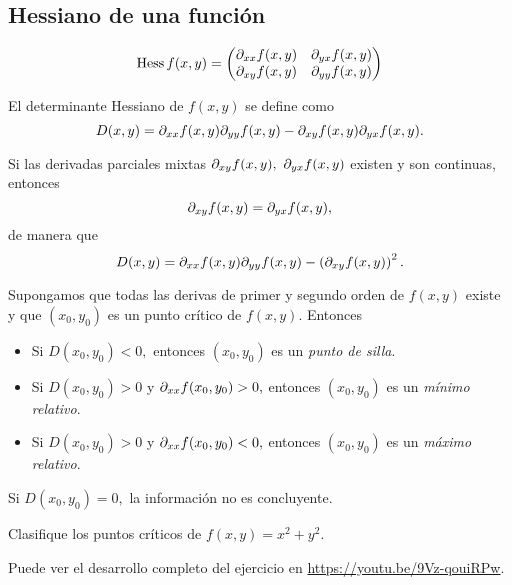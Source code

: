 \subsection{Hessiano de una funci\'on}
\[
	\label{hess}  
	\operatorname{Hess}f(x,y)=
	\begin{pmatrix}\partial_{xx}f(x,y) &\partial_{yx}f(x,y) \cr \partial_{xy}f(x,y) & \partial_{yy}f(x,y) \end{pmatrix}
\]





El determinante Hessiano de $f(x,y)$ se define como
$$
D(x,y)=\partial_{xx}f(x,y)\partial_{yy}f(x,y)-\partial_{xy}f(x,y)\partial_{yx}f(x,y).
$$



\begin{observacion}
	Si las derivadas parciales mixtas $\partial_{xy}f(x,y), \ \partial_{yx}f(x,y)$ existen y son continuas, entonces
	$$
	\partial_{xy}f(x,y)=\partial_{yx}f(x,y),
	$$
	de manera que 
	$$
	D(x,y)=\partial_{xx}f(x,y)\partial_{yy}f(x,y)-\left( \partial_{xy}f(x,y) \right)^{2}.
	$$
\end{observacion}




\begin{teorema}
	Supongamos que todas las derivas de primer y segundo orden de $f(x,y)$ existe y que $(x_{0},y_{0})$ es un punto cr\'itico de $f(x,y).$ Entonces
	\begin{itemize}
		\item Si $D(x_{0},y_{0}) < 0,$ entonces $(x_{0},y_{0})$ es un \emph{punto de silla}.
		\item Si $D(x_{0},y_{0}) > 0$ y $\partial_{xx}f(x_{0},y_{0})>0,$ entonces $(x_{0},y_{0})$ es un \emph{m\'inimo relativo}.
		\item Si $D(x_{0},y_{0}) > 0$ y $\partial_{xx}f(x_{0},y_{0})<0,$ entonces $(x_{0},y_{0})$ es un \emph{máximo relativo}.
	\end{itemize}
	
\end{teorema}

\begin{observacion}
	Si $D(x_{0},y_{0}) = 0,$ la informaci\'on no es concluyente.
\end{observacion}




\begin{problema}
	Clasifique los puntos cr\'iticos de $f(x,y)=x^{2}+y^{2}.$
\end{problema}

Puede ver el desarrollo completo del ejercicio en \href{https://www.youtube.com/watch?v=9Vz-qouiRPw}{https://youtu.be/9Vz-qouiRPw}. 

